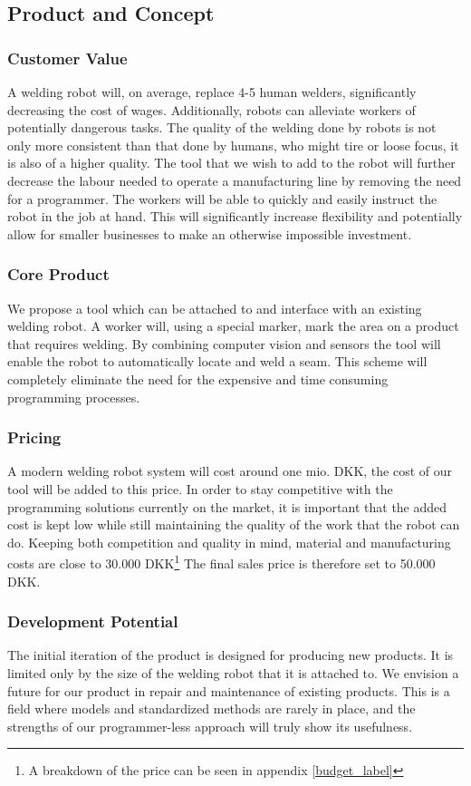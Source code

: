 \subsection{Product and Concept}

\subsubsection{Customer Value}
A welding robot will, on average, replace 4-5 human welders, significantly decreasing the cost of wages. Additionally, robots can alleviate workers of potentially dangerous tasks. The quality of the welding done by robots is not only more consistent than that done by humans, who might tire or loose focus, it is also of a higher quality. The tool that we wish to add to the robot will further decrease the labour needed to operate a manufacturing line by removing the need for a programmer. The workers will be able to quickly and easily instruct the robot in the job at hand. This will significantly increase flexibility and potentially allow for smaller businesses to make an otherwise impossible investment.

\subsubsection{Core Product}
We propose a tool which can be attached to and interface with an existing welding robot. 
A worker will, using a special marker, mark the area on a product that requires welding. By combining computer vision and sensors the tool will enable the robot to automatically locate and weld a seam. This scheme will completely eliminate the need for the expensive and time consuming programming processes.

\subsubsection{Pricing}
A modern welding robot system will cost around one mio. DKK, the cost of our tool will be added to this price. In order to stay competitive with the programming solutions currently on the market, it is important that the added cost is kept low while still maintaining the quality of the work that the robot can do. Keeping both competition and quality in mind, material and manufacturing costs are close to 30.000 DKK\footnote{A breakdown of the price can be seen in appendix \ref{budget_label}} 
The final sales price is therefore set to 50.000 DKK.

\subsubsection{Development Potential}
The initial iteration of the product is designed for producing new products. It is limited only by the size of the welding robot that it is attached to. We envision a future for our product in repair and maintenance of existing products. This is a field where models and standardized methods are rarely in place, and the strengths of our programmer-less approach will truly show its usefulness.

